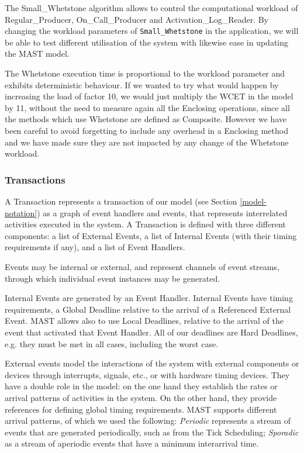 \documentclass{article}
\begin{document}
The Small\_Whetstone algorithm allows to control the computational workload of Regular\_Producer, On\_Call\_Producer and Activation\_Log\_Reader. By changing the workload parameters of \texttt{Small\_Whetstone} in the application, we will be able to test different utilisation of the system with likewise ease in updating the MAST model.

The Whetstone execution time is proportional to the workload parameter and exhibits deterministic behaviour. If we wanted to try what would happen by increasing the load of factor 10, we would just multiply the WCET in the model by 11, without the need to measure again all the Enclosing operations, since all the methods which use Whetstone are defined as Composite. However we have been careful to avoid forgetting to include any overhead in a Enclosing method and we have made sure they are not impacted by any change of the Whetstone workload.

\subsubsection{Transactions}

A Transaction represents a transaction of our model (see Section \ref{model-notation}) as a graph of event handlers and events, that represents interrelated activities executed in the system. A Transaction is defined with three different components: a list of External Events, a list of Internal Events (with their timing requirements if any), and a list of Event Handlers.

Events may be internal or external, and represent channels of event streams, through which individual event instances may be generated.

Internal Events are generated by an Event Handler. Internal Events have timing requirements, a Global Deadline relative to the arrival of a Referenced External Event. MAST allows also to use Local Deadlines, relative to the arrival of the event that activated that Event Handler. All of our deadlines are Hard Deadlines, e.g. they must be met in all cases, including the worst case.

External events model the interactions of the system with external components or devices through interrupts, signals, etc., or with hardware timing devices. They have a double role in the model: on the one hand they establish the rates or arrival patterns of activities in the system. On the other hand, they provide references for defining global timing requirements. MAST supports different arrival patterns, of which we used the following: \textit{Periodic} represents a stream of events that are generated periodically, such as from the Tick Scheduling; \textit{Sporadic} as a stream of aperiodic events that have a minimum interarrival time.
\end{document}

